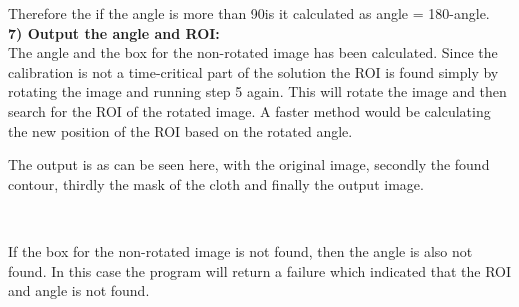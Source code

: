 Therefore the if the angle is more than 90\degree is it calculated as angle = 180\degree-angle.\\

\textbf{7) Output the angle and ROI:}\\
The angle and the box for the non-rotated image has been calculated. Since the calibration is not a time-critical part of the solution the ROI is found simply by rotating the image and running step 5 again.  This will rotate the image and then search for the ROI of the rotated image. A faster method would be calculating the new position of the ROI based on the rotated angle.

The output is as can be seen here, with the original image, secondly the found contour, thirdly the mask of the cloth and finally the output image.

\begin{figure}[H]
\centering
{}
\\
\end{figure}



If the box for the non-rotated image is not found, then the angle is also not found. In this case the program will return a failure which indicated that the ROI and angle is not found. 